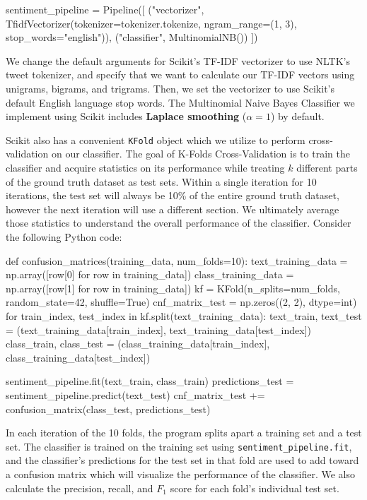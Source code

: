 \documentclass[11pt, twoside, reqno]{book}
\begin{document}
\begin{python}
sentiment_pipeline = Pipeline([
    ("vectorizer", TfidfVectorizer(tokenizer=tokenizer.tokenize,
                                   ngram_range=(1, 3),
                                   stop_words="english")),
    ("classifier", MultinomialNB())
])
\end{python}

\noindent
We change the default arguments for Scikit's TF-IDF vectorizer to use NLTK's tweet tokenizer, and specify that we want to calculate our TF-IDF vectors using unigrams, bigrams, and trigrams. Then, we set the vectorizer to use Scikit's default English language stop words. The Multinomial Naive Bayes Classifier we implement using Scikit includes \textbf{Laplace smoothing} ($\alpha=1$) by default. 

Scikit also has a convenient \verb|KFold| object which we utilize to perform cross-validation on our classifier. The goal of K-Folds Cross-Validation is to train the classifier and acquire statistics on its performance while treating $k$ different parts of the ground truth dataset as test sets. Within a single iteration for 10 iterations, the test set will always be 10\% of the entire ground truth dataset, however the next iteration will use a different section. We ultimately average those statistics to understand the overall performance of the classifier. Consider the following Python code:

\begin{python}
def confusion_matrices(training_data, num_folds=10):
    text_training_data = np.array([row[0] for row in training_data])
    class_training_data = np.array([row[1] for row in training_data])
    kf = KFold(n_splits=num_folds, random_state=42, shuffle=True)
    cnf_matrix_test = np.zeros((2, 2), dtype=int)
    for train_index, test_index in kf.split(text_training_data):
        text_train, text_test = (text_training_data[train_index], 
                                 text_training_data[test_index])
        class_train, class_test = (class_training_data[train_index], 
                                   class_training_data[test_index])

        sentiment_pipeline.fit(text_train, class_train)
        predictions_test = sentiment_pipeline.predict(text_test)
        cnf_matrix_test += confusion_matrix(class_test, predictions_test)
\end{python}

\noindent
In each iteration of the 10 folds, the program splits apart a training set and a test set. The classifier is trained on the training set using \verb|sentiment_pipeline.fit|, and the classifier's predictions for the test set in that fold are used to add toward a confusion matrix which will visualize the performance of the classifier. We also calculate the precision, recall, and $F_{1}$ score for each fold's individual test set.
\end{document}
